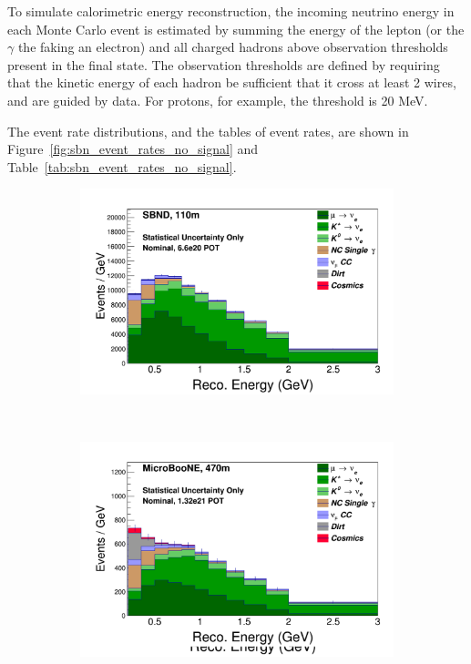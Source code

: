 To simulate calorimetric energy reconstruction, the incoming neutrino energy in each Monte Carlo event is estimated by summing the energy of the lepton (or the $\gamma$ the faking an electron) and all charged hadrons above observation thresholds present in the final state.  The observation thresholds are defined by requiring that the kinetic energy of each hadron be sufficient that it cross at least 2 wires, and are guided by \argoneut data.  For protons, for example, the threshold is 20 MeV. 

The event rate distributions, and the tables of event rates, are shown in Figure~\ref{fig:sbn_event_rates_no_signal} and Table~\ref{tab:sbn_event_rates_no_signal}.

\begin{figure}[]
    \centering
    \begin{subfigure}[]{0.49\textwidth}
        \centering
        \includegraphics[width=\textwidth]{sbn_figures/nominal_nue_appearance_nosig_SBND_110m}
    \end{subfigure}
    ~
    \begin{subfigure}[]{0.49\textwidth}
        \centering
        \includegraphics[width=\textwidth]{sbn_figures/nominal_nue_appearance_nosig_MicroBooNE_470m}

\end{subfigure}
\end{figure}
